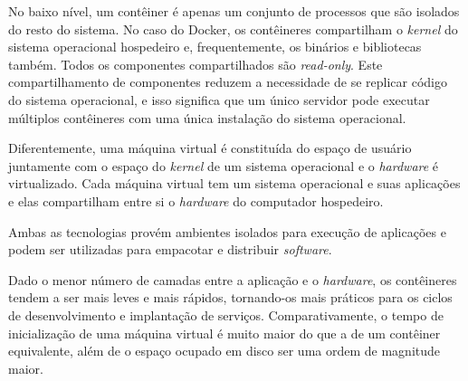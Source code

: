 	No baixo nível, um contêiner é apenas um conjunto de processos que são isolados do resto do sistema. No caso do Docker, os contêineres compartilham o \textit{kernel} do sistema operacional hospedeiro e, frequentemente, os binários e bibliotecas também. Todos os componentes compartilhados são \textit{read-only}. Este compartilhamento de componentes reduzem a necessidade de se replicar código do sistema operacional, e isso significa que um único servidor pode executar múltiplos contêineres com uma única instalação do sistema operacional.

	Diferentemente, uma máquina virtual é constituída do espaço de usuário juntamente com o espaço do \textit{kernel} de um sistema operacional e o \textit{hardware} é virtualizado. Cada máquina virtual tem um sistema operacional e suas aplicações e elas compartilham entre si o \textit{hardware} do computador hospedeiro.

	Ambas as tecnologias provém ambientes isolados para execução de aplicações e podem ser utilizadas para empacotar e distribuir \textit{software}.

	Dado o menor número de camadas entre a aplicação e o \textit{hardware},  os contêineres tendem a ser mais leves e mais rápidos, tornando-os mais práticos para os ciclos de desenvolvimento e implantação de serviços. Comparativamente, o tempo de inicialização de uma máquina virtual é muito maior do que a de um contêiner equivalente, além de o espaço ocupado em disco ser uma ordem de magnitude maior. \cite{whatsthediffvmvscontainers}
	
